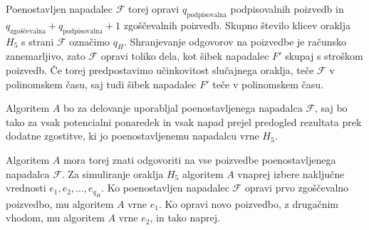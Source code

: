 \begin{dokaz}
Poenostavljen napadalec $\mathcal{F}$ torej opravi $q_{\text{podpisovalna}}$ podpisovalnih poizvedb
in $q_{\text{zgoščevalna}} + q_{\text{podpisovalna}} + 1$ zgoščevalnih poizvedb. Skupno število
klicev oraklja $H_5$ s strani $\mathcal{F}$ označimo $q_H$. Shranjevanje odgovorov na poizvedbe je
računsko zanemarljivo, zato $\mathcal{F}$ opravi toliko dela, kot šibek napadalec $F'$ skupaj s
stroškom poizvedb. Če torej predpostavimo učinkovitost slučajnega oraklja, teče $\mathcal{F}$ v
polinomskem času, saj tudi šibek napadalec $F'$ teče v polinomskem času.

Algoritem $A$ bo za delovanje uporabljal poenostavljenega napadalca $\mathcal{F}$, saj bo tako za
vsak potencialni ponaredek in vsak napad prejel predogled rezultata prek dodatne zgostitve, ki jo
poenostavljenemu napadalcu vrne $H_5$.

Algoritem $A$ mora torej znati odgovoriti na vse poizvedbe poenostavljenega napadalca $\mathcal{F}$.
Za simuliranje oraklja $H_5$ algoritem $A$ vnaprej izbere naključne vrednosti $e_1, e_2, \dots, e_{q_H}$.
Ko poenostavljen napadalec $\mathcal{F}$ opravi prvo zgoščevalno poizvedbo, mu algoritem $A$ vrne
$e_1$. Ko opravi novo poizvedbo, z drugačnim vhodom, mu algoritem $A$ vrne $e_2$, in tako naprej.


\end{dokaz}
